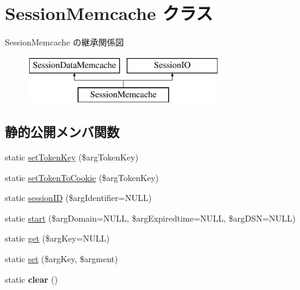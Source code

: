\hypertarget{class_session_memcache}{}\section{Session\+Memcache クラス}
\label{class_session_memcache}
Session\+Memcache の継承関係図\begin{figure}[H]
\begin{center}
\leavevmode
\includegraphics[height=2.000000cm]{class_session_memcache}
\end{center}
\end{figure}
\subsection*{静的公開メンバ関数}
\begin{DoxyCompactItemize}
\item 
static \hyperlink{class_session_memcache_afbae4efe8515a20952293b5aad860470}{set\+Token\+Key} (\$arg\+Token\+Key)
\item 
static \hyperlink{class_session_memcache_a17b8590eb45d4197b1a2aafdd51cb834}{set\+Token\+To\+Cookie} (\$arg\+Token\+Key)
\item 
static \hyperlink{class_session_memcache_ab3f2ecd0f293845de6fb19e3d1618679}{session\+I\+D} (\$arg\+Identifier=N\+U\+L\+L)
\item 
static \hyperlink{class_session_memcache_aa0825e48d7080884156f4d7f91a15c89}{start} (\$arg\+Domain=N\+U\+L\+L, \$arg\+Expiredtime=N\+U\+L\+L, \$arg\+D\+S\+N=N\+U\+L\+L)
\item 
static \hyperlink{class_session_memcache_acde5d140c72c0d5b4738e989fd0e9b66}{get} (\$arg\+Key=N\+U\+L\+L)
\item 
static \hyperlink{class_session_memcache_af6c394389bb0e91f214a985062c2098c}{set} (\$arg\+Key, \$argment)
\item 
\hypertarget{class_session_memcache_a926f82a655e4bb974d7a41291b580f56}{}static {\bfseries clear} ()\label{class_session_memcache_a926f82a655e4bb974d7a41291b580f56}

\end{DoxyCompactItemize}
